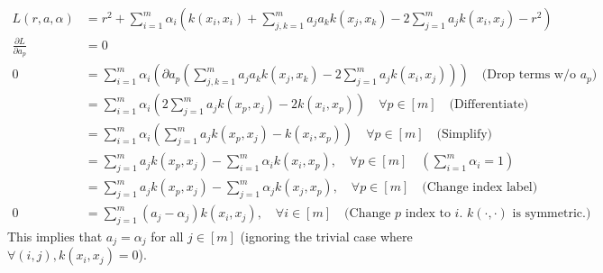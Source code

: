 \documentclass{article}
\begin{document}
\begin{align*}
L(r, a, \alpha) &= r^2 + \sum_{i=1}^{m} \alpha_i \left( k(x_i, x_i) + \sum_{j,k=1}^{m} a_j a_k k(x_j, x_k) - 2 \sum_{j=1}^{m} a_j k(x_i, x_j) - r^2 \right) \\
\frac{\partial L}{\partial a_p}  &= 0\\
0 &= \sum_{i=1}^{m} \alpha_i \left( \partial a_p\left(\sum_{j,k=1}^{m} a_j a_k k(x_j, x_k) - 2 \sum_{j=1}^{m} a_j k(x_i, x_j)\right)\right)\quad\text{(Drop terms w/o $a_p$)}\\
&= \sum_{i=1}^{m}\alpha_i \left( 2\sum_{j=1}^{m} a_j k(x_p, x_j) - 2 k(x_i, x_p) \right) \quad \forall p \in [m] \quad \text{(Differentiate)}\\
 &= \sum_{i=1}^{m}\alpha_i \left( \sum_{j=1}^{m} a_j k(x_p, x_j) - k(x_i, x_p) \right) \quad \forall p \in [m] \quad \text{(Simplify)} \\
 &= \sum_{j=1}^{m} a_j k(x_p, x_j) - \sum_{i=1}^{m}\alpha_i k(x_i, x_p), \quad \forall p \in [m] \quad \left(\sum_{i=1}^{m}\alpha_i = 1\right) \\
 &= \sum_{j=1}^{m} a_j k(x_p, x_j) - \sum_{j=1}^{m}\alpha_j k(x_j, x_p), \quad \forall p \in [m] \quad \text{(Change index label)} \\
0 &= \sum_{j=1}^{m} (a_j - \alpha_j)k(x_i, x_j), \quad \forall i \in [m] \quad \text{(Change $p$ index to $i$. $k(\cdot,\cdot)$ is symmetric.)}
\end{align*}
This implies that $a_j = \alpha_j$ for all $j \in [m]$ (ignoring the trivial case where $\forall (i, j), k(x_i,x_j) = 0$). 
\end{document}
